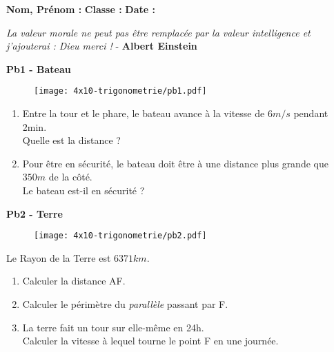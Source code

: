



\textbf{Nom, Prénom :} \hspace{8cm} \textbf{Classe :} \hspace{3cm} \textbf{Date :}\\

\vspace{-0.5cm} \begin{center}
  \textit{La valeur morale ne peut pas être remplacée par la valeur intelligence et j'ajouterai : Dieu merci !}  - \textbf{Albert Einstein}
\end{center}

\begin{multicols}{2}

\textbf{Pb1 - Bateau}

\begin{figure}[H]
  \centering
  \texttt{[image: 4x10-trigonometrie/pb1.pdf]}
\end{figure}

\begin{enumerate}
  \item Entre la tour et le phare, le bateau avance à la vitesse de $6m/s$ pendant 2min. \\
  Quelle est la distance ?
  \item Pour être en sécurité, le bateau doit être à une distance plus grande que $350m$ de la côté. \\
  Le bateau est-il en sécurité ?
\end{enumerate} \columnbreak

\Pointilles[17]

\end{multicols}

\textbf{Pb2 - Terre}

\begin{multicols}{2}

  \begin{figure}[H]
    \centering
    \texttt{[image: 4x10-trigonometrie/pb2.pdf]}
  \end{figure}
  
  Le Rayon de la Terre est $6 371 km$. 
  \begin{enumerate}
    \item Calculer la distance AF.
    \item Calculer le périmètre du \textit{parallèle} passant par F.
    \item La terre fait un tour sur elle-même en 24h. \\
    Calculer la vitesse à lequel tourne le point F en une journée.
  \end{enumerate} \columnbreak

  \Pointilles[18]

\end{multicols}

\Pointilles[8]



